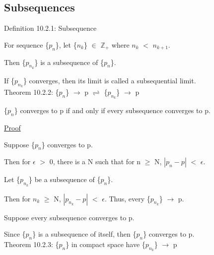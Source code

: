 \newpage





\subsection{Subsequences}

{ \color{blue} Definition 10.2.1: Subsequence } 

    \begin{adjustbox}{minipage=14cm, right, vspace=0.1cm 0cm}
        For sequence \{$p_n$\}, let \{$n_k$\} $\in$ $\mathbb{Z}_+$
        where $n_k$ $<$ $n_{k+1}$.

        Then \{$p_{n_k}$\} is a subsequence of \{$p_n$\}.
        
        If \{$p_{n_k}$\} converges, then its limit is called
        a subsequential limit. \\
	\end{adjustbox}

{ \color{red} Theorem 10.2.2:
\{$p_n$\} $\rightarrow$ p $\rightleftharpoons$ \{$p_{n_k}$\} $\rightarrow$ p }

    \begin{adjustbox}{minipage=14cm, right, vspace=0.1cm 0cm}
        \{$p_n$\} converges to p if and only if every subsequence
        converges to p.
    \end{adjustbox}

{ \color{magenta} \underline{Proof} }

    Suppose \{$p_n$\} converges to p.

    Then for $\epsilon$ $>$ 0, there is a N such that for n $\geq$ N,
    $|p_n - p|$ $<$ $\epsilon$.

    Let \{$p_{n_k}$\} be a subsequence of \{$p_n$\}.

    Then for $n_k$ $\geq$ N, $|p_{n_k} - p|$ $<$ $\epsilon$.
    Thus, every \{$p_{n_k}$\} $\rightarrow$ p.

    Suppose every subsequence converges to p.

    Since \{$p_n$\} is a subsequence of itself, then
    \{$p_n$\} converges to p. \\

{ \color{red} Theorem 10.2.3:
\{$p_n$\} in compact space have \{$p_{n_k}$\} $\rightarrow$ p }

